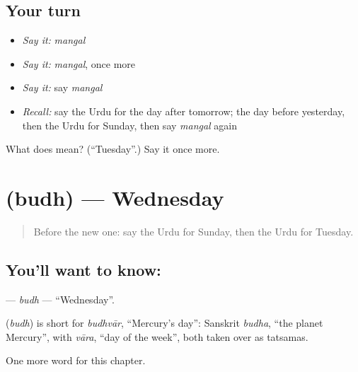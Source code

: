 \subsection*{Your turn}
\begin{itemize}
\raggedright
  \item \emph{Say it:} \emph{mangal}
  \item \emph{Say it:} \emph{mangal}, once more
  \item \emph{Say it:} say \emph{mangal}
  \item \emph{Recall:} say the Urdu for the day after tomorrow; the day before yesterday, then the Urdu for Sunday, then say \emph{mangal} again
\end{itemize}

\begin{tcolorbox}[breakable,colback=teal!4,colframe=teal!35!black,title={Before you move on}]
What does  mean? (\textquotedblleft{}Tuesday\textquotedblright{}.) Say it once more.
\end{tcolorbox}
\section[\texorpdfstring{\ur{بدھ} (budh)}{بدھ (budh)}]{ (budh) — Wednesday}

\label{lesson:UR-C92-budh}



\begin{quote}
Before the new one: say the Urdu for Sunday, then the Urdu for Tuesday.
\end{quote}

\subsection*{You'll want to know: }
\textbf{} — \emph{budh} — \textquotedblleft{}Wednesday\textquotedblright{}.

\begin{cousinweb}
\textbf{} (\emph{budh}) is short for \emph{budhvār}, \textquotedblleft{}Mercury's day\textquotedblright{}: Sanskrit \emph{budha}, \textquotedblleft{}the planet Mercury\textquotedblright{}, with \emph{vāra}, \textquotedblleft{}day of the week\textquotedblright{}, both taken over as tatsamas.
\end{cousinweb}

\begin{grammarlens}[title={What you've built}]
One more word for this chapter.
\end{grammarlens}

